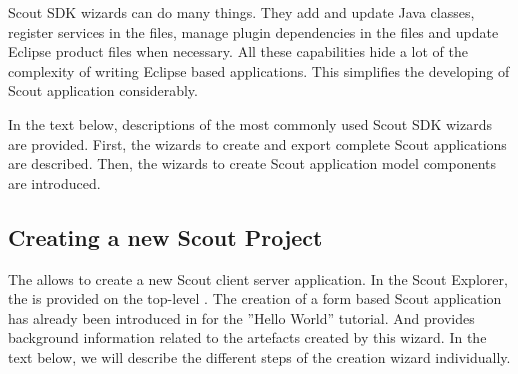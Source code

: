 \documentclass[a4paper,10pt,twoside]{book}
\begin{document}
Scout SDK wizards can do many things. 
They add and update Java classes, register services in the  files, manage plugin dependencies in the  files and update Eclipse product files when necessary. 
All these capabilities hide a lot of the complexity of writing Eclipse based applications. 
This simplifies the developing of Scout application considerably.

In the text below, descriptions of the most commonly used Scout SDK wizards are provided. 
First, the wizards to create and export complete Scout applications are described. 
Then, the wizards to create Scout application model components are introduced. 

\subsection{Creating a new Scout Project}

The  allows to create a new Scout client server application. 
In the Scout Explorer, the  is provided on the top-level . 
The creation of a form based Scout application has already been introduced in  for the ''Hello World'' tutorial.
And  provides background information related to the artefacts created by this wizard. 
In the text below, we will describe the different steps of the creation wizard individually.
\end{document}
